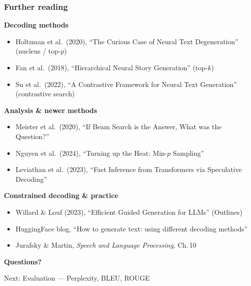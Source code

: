 \documentclass[aspectratio=169]{beamer}
\begin{document}
\begin{frame}
\frametitle{Further reading}
\vspace{0.1cm}

{\small
\textcolor{popblue}{\textbf{Decoding methods}}
\begin{itemize}\setlength{\itemsep}{2pt}
  \item Holtzman et al.\ (2020), ``The Curious Case of Neural Text Degeneration'' (nucleus / top-$p$)
  \item Fan et al.\ (2018), ``Hierarchical Neural Story Generation'' (top-$k$)
  \item Su et al.\ (2022), ``A Contrastive Framework for Neural Text Generation'' (contrastive search)
\end{itemize}

\textcolor{paramgreen}{\textbf{Analysis \& newer methods}}
\begin{itemize}\setlength{\itemsep}{2pt}
  \item Meister et al.\ (2020), ``If Beam Search is the Answer, What was the Question?''
  \item Nguyen et al.\ (2024), ``Turning up the Heat: Min-$p$ Sampling''
  \item Leviathan et al.\ (2023), ``Fast Inference from Transformers via Speculative Decoding''
\end{itemize}

\textcolor{orange1}{\textbf{Constrained decoding \& practice}}
\begin{itemize}\setlength{\itemsep}{2pt}
  \item Willard \& Louf (2023), ``Efficient Guided Generation for LLMs'' (Outlines)
  \item HuggingFace blog, ``How to generate text: using different decoding methods''
  \item Jurafsky \& Martin, \emph{Speech and Language Processing}, Ch.\,10
\end{itemize}
}
\end{frame}

\begin{frame}
\begin{center}
  {\Huge\bfseries\textcolor{popblue}{Questions?}}

  \vspace{1cm}

  {\large Next: Evaluation --- Perplexity, BLEU, ROUGE}
\end{center}
\end{frame}
\end{document}
